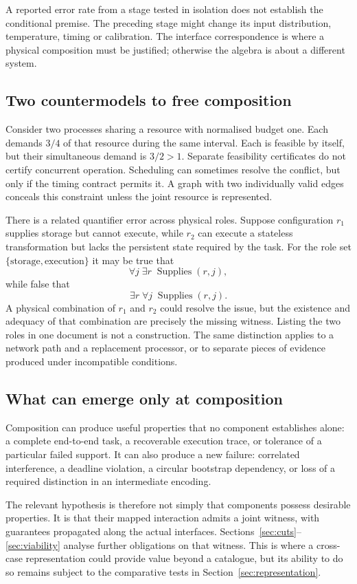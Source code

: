 A reported error rate from a stage tested in isolation does not establish the conditional premise. The preceding stage might change its input distribution, temperature, timing or calibration. The interface correspondence is where a physical composition must be justified; otherwise the algebra is about a different system.

\subsection{Two countermodels to free composition}
Consider two processes sharing a resource with normalised budget one. Each demands $3/4$ of that resource during the same interval. Each is feasible by itself, but their simultaneous demand is $3/2>1$. Separate feasibility certificates do not certify concurrent operation. Scheduling can sometimes resolve the conflict, but only if the timing contract permits it. A graph with two individually valid edges conceals this constraint unless the joint resource is represented.

There is a related quantifier error across physical roles. Suppose configuration $r_1$ supplies storage but cannot execute, while $r_2$ can execute a stateless transformation but lacks the persistent state required by the task. For the role set $\{\text{storage},\text{execution}\}$ it may be true that
\[
 \forall j\;\exists r\;\operatorname{Supplies}(r,j),
\]
while false that
\[
 \exists r\;\forall j\;\operatorname{Supplies}(r,j).
\]
A physical combination of $r_1$ and $r_2$ could resolve the issue, but the existence and adequacy of that combination are precisely the missing witness. Listing the two roles in one document is not a construction. The same distinction applies to a network path and a replacement processor, or to separate pieces of evidence produced under incompatible conditions.

\subsection{What can emerge only at composition}
Composition can produce useful properties that no component establishes alone: a complete end-to-end task, a recoverable execution trace, or tolerance of a particular failed support. It can also produce a new failure: correlated interference, a deadline violation, a circular bootstrap dependency, or loss of a required distinction in an intermediate encoding.

The relevant hypothesis is therefore not simply that components possess desirable properties. It is that their mapped interaction admits a joint witness, with guarantees propagated along the actual interfaces. Sections~\ref{sec:cuts}--\ref{sec:viability} analyse further obligations on that witness. This is where a cross-case representation could provide value beyond a catalogue, but its ability to do so remains subject to the comparative tests in Section~\ref{sec:representation}.

